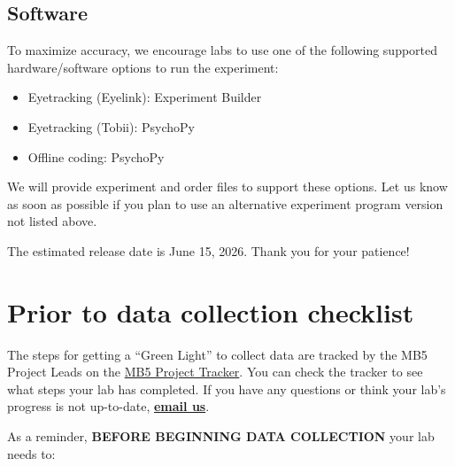 \documentclass[
  letterpaper,
  DIV=11,
  numbers=noendperiod,
  oneside]{scrreprt}
\providecommand{\tightlist}{%
  \setlength{\itemsep}{0pt}\setlength{\parskip}{0pt}}
\begin{document}
\section{Software}\label{software}

To maximize accuracy, we encourage labs to use one of the following
supported hardware/software options to run the experiment:

\begin{itemize}
\tightlist
\item
  Eyetracking (Eyelink): Experiment Builder
\item
  Eyetracking (Tobii): PsychoPy
\item
  Offline coding: PsychoPy
\end{itemize}

We will provide experiment and order files to support these options. Let
us know as soon as possible if you plan to use an alternative experiment
program version not listed above.

\begin{tcolorbox}[enhanced jigsaw, coltitle=black, colframe=quarto-callout-important-color-frame, titlerule=0mm, colback=white, arc=.35mm, toprule=.15mm, left=2mm, colbacktitle=quarto-callout-important-color!10!white, opacityback=0, bottomtitle=1mm, title=\textcolor{quarto-callout-important-color}{\faExclamation}\hspace{0.5em}{Experiment files are in final development \& testing}, breakable, rightrule=.15mm, opacitybacktitle=0.6, toptitle=1mm, leftrule=.75mm, bottomrule=.15mm]

The estimated release date is June 15, 2026. Thank you for your
patience!

\end{tcolorbox}

\chapter{Prior to data collection
checklist}\label{prior-to-data-collection-checklist}

The steps for getting a ``Green Light'' to collect data are tracked by
the MB5 Project Leads on the
\href{https://manybabies.org/mb5-tracker}{MB5 Project Tracker}. You can
check the tracker to see what steps your lab has completed. If you have
any questions or think your lab's progress is not up-to-date,
\href{mailto:mb5@manybabies.org}{\textbf{email us}}.

As a reminder, \textbf{BEFORE BEGINNING DATA COLLECTION} your lab needs
to:
\end{document}
